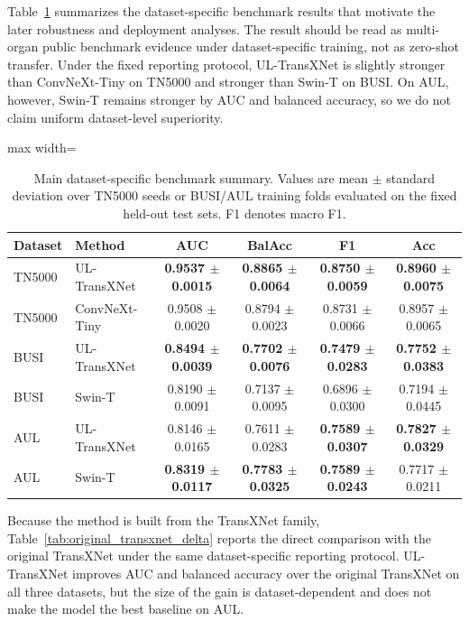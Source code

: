 \documentclass[preprint,12pt]{elsarticle}
\begin{document}
Table~\ref{tab:main_benchmark} summarizes the dataset-specific benchmark results that motivate the later robustness and deployment analyses. The result should be read as multi-organ public benchmark evidence under dataset-specific training, not as zero-shot transfer. Under the fixed reporting protocol, UL-TransXNet is slightly stronger than ConvNeXt-Tiny on TN5000 and stronger than Swin-T on BUSI. On AUL, however, Swin-T remains stronger by AUC and balanced accuracy, so we do not claim uniform dataset-level superiority.

\begin{table}[!htbp]
    \centering
    \small
    \caption{Main dataset-specific benchmark summary. Values are mean $\pm$ standard deviation over TN5000 seeds or BUSI/AUL training folds evaluated on the fixed held-out test sets. F1 denotes macro F1.}
    \label{tab:main_benchmark}
    \begin{adjustbox}{max width=\columnwidth}
    \begin{tabular}{llcccc}
        \toprule
        Dataset & Method & AUC & BalAcc & F1 & Acc \\
        \midrule
        TN5000 & UL-TransXNet & \textbf{0.9537 $\pm$ 0.0015} & \textbf{0.8865 $\pm$ 0.0064} & \textbf{0.8750 $\pm$ 0.0059} & \textbf{0.8960 $\pm$ 0.0075} \\
        TN5000 & ConvNeXt-Tiny & 0.9508 $\pm$ 0.0020 & 0.8794 $\pm$ 0.0023 & 0.8731 $\pm$ 0.0066 & 0.8957 $\pm$ 0.0065 \\
        \midrule
        BUSI & UL-TransXNet & \textbf{0.8494 $\pm$ 0.0039} & \textbf{0.7702 $\pm$ 0.0076} & \textbf{0.7479 $\pm$ 0.0283} & \textbf{0.7752 $\pm$ 0.0383} \\
        BUSI & Swin-T & 0.8190 $\pm$ 0.0091 & 0.7137 $\pm$ 0.0095 & 0.6896 $\pm$ 0.0300 & 0.7194 $\pm$ 0.0445 \\
        \midrule
        AUL & UL-TransXNet & 0.8146 $\pm$ 0.0165 & 0.7611 $\pm$ 0.0283 & \textbf{0.7589 $\pm$ 0.0307} & \textbf{0.7827 $\pm$ 0.0329} \\
        AUL & Swin-T & \textbf{0.8319 $\pm$ 0.0117} & \textbf{0.7783 $\pm$ 0.0325} & \textbf{0.7589 $\pm$ 0.0243} & 0.7717 $\pm$ 0.0211 \\
        \bottomrule
    \end{tabular}
    \end{adjustbox}
\end{table}

Because the method is built from the TransXNet family, Table~\ref{tab:original_transxnet_delta} reports the direct comparison with the original TransXNet under the same dataset-specific reporting protocol. UL-TransXNet improves AUC and balanced accuracy over the original TransXNet on all three datasets, but the size of the gain is dataset-dependent and does not make the model the best baseline on AUL.
\end{document}
